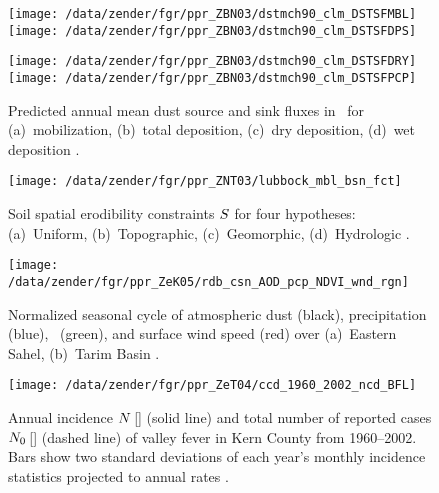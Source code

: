\documentclass[12pt]{article}
\begin{document}
\Large
\begin{figure*}
\centering %
\texttt{[image: /data/zender/fgr/ppr\_ZBN03/dstmch90\_clm\_DSTSFMBL]}%
\texttt{[image: /data/zender/fgr/ppr\_ZBN03/dstmch90\_clm\_DSTSFDPS]}%

\texttt{[image: /data/zender/fgr/ppr\_ZBN03/dstmch90\_clm\_DSTSFDRY]}%
\texttt{[image: /data/zender/fgr/ppr\_ZBN03/dstmch90\_clm\_DSTSFPCP]}%
\caption{
Predicted annual mean dust source and sink fluxes in \ugxmSs\ for
(a)~mobilization, (b)~total deposition, (c)~dry deposition, 
(d)~wet deposition \cite[][]{ZBN03}.
\label{fgr:sf}}
\end{figure*}
\clearpage

\Large
\begin{figure}
\texttt{[image: /data/zender/fgr/ppr\_ZNT03/lubbock\_mbl\_bsn\_fct]}\vfill
\caption{
Soil spatial erodibility constraints $S$ for four hypotheses: 
(a)~Uniform, (b)~Topographic, 
(c)~Geomorphic, (d)~Hydrologic \cite[][]{ZNT03}.
\label{fgr:mbl_bsn_fct}}
\end{figure}
\clearpage

\Large
\begin{figure}
\texttt{[image: /data/zender/fgr/ppr\_ZeK05/rdb\_csn\_AOD\_pcp\_NDVI\_wnd\_rgn]}%
\caption{
Normalized seasonal cycle of atmospheric dust (black),
precipitation (blue), \NDVI\ (green), and surface wind speed (red)
over (a)~Eastern Sahel, (b)~Tarim Basin \cite[][]{ZeK05}.
\label{fgr:csn}}
\end{figure}
\clearpage

\Large
\begin{figure}
\centering %
\texttt{[image: /data/zender/fgr/ppr\_ZeT04/ccd\_1960\_2002\_ncd\_BFL]}%
\caption{
Annual incidence $N$\,[\nbrxyrfz] (solid line) 
and total number of reported cases $N_{0}$\,[\nbrxyr] (dashed line)
of valley fever in Kern County from 1960--2002.
Bars show two standard deviations of each year's monthly incidence
statistics projected to annual rates \cite[][]{ZeT04}.
\label{fgr:ncd}}
\end{figure}
\clearpage
\end{document}
